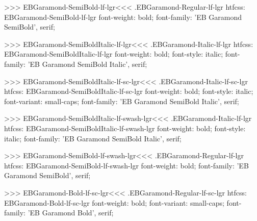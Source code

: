 >>>
\<EBGaramond-SemiBold-lf-lgr\><<<
.EBGaramond-Regular-lf-lgr
htfcss:  EBGaramond-SemiBold-lf-lgr  font-weight: bold; font-family: 'EB Garamond SemiBold', serif;

>>>
\<EBGaramond-SemiBoldItalic-lf-lgr\><<<
.EBGaramond-Italic-lf-lgr
htfcss:  EBGaramond-SemiBoldItalic-lf-lgr  font-weight: bold; font-style: italic; font-family: 'EB Garamond SemiBold Italic', serif;

>>>
\<EBGaramond-SemiBoldItalic-lf-sc-lgr\><<<
.EBGaramond-Italic-lf-sc-lgr
htfcss:  EBGaramond-SemiBoldItalic-lf-sc-lgr  font-weight: bold; font-style: italic; font-variant: small-caps; font-family: 'EB Garamond SemiBold Italic', serif;

>>>
\<EBGaramond-SemiBoldItalic-lf-swash-lgr\><<<
.EBGaramond-Italic-lf-lgr
htfcss:  EBGaramond-SemiBoldItalic-lf-swash-lgr  font-weight: bold; font-style: italic; font-family: 'EB Garamond SemiBold Italic', serif;

>>>
\<EBGaramond-SemiBold-lf-swash-lgr\><<<
.EBGaramond-Regular-lf-lgr
htfcss:  EBGaramond-SemiBold-lf-swash-lgr  font-weight: bold; font-family: 'EB Garamond SemiBold', serif;

>>>
\<EBGaramond-Bold-lf-sc-lgr\><<<
.EBGaramond-Regular-lf-sc-lgr
htfcss:  EBGaramond-Bold-lf-sc-lgr  font-weight: bold; font-variant: small-caps; font-family: 'EB Garamond Bold', serif;

